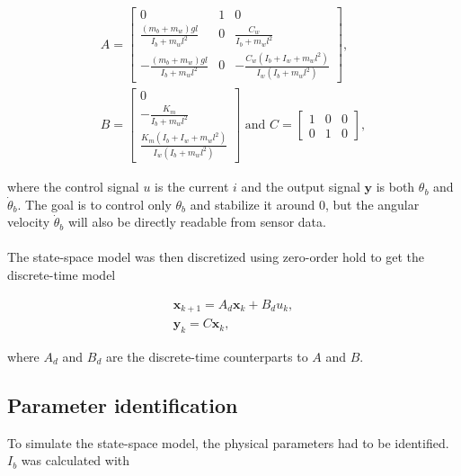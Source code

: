 \begin{equation}\label{eq:ss-matrices}
    \begin{gathered}
        A =
        \begin{bmatrix}
            0 & 1 & 0 \\
            \frac{(m_b+m_w)gl}{I_b+m_wl^2} & 0 & \frac{C_w}{I_b+m_wl^2} \\
            -\frac{(m_b+m_w)gl}{I_b+m_wl^2} & 0 & -\frac{C_w(I_b+I_w+m_wl^2)}{I_w(I_b+m_wl^2)}
        \end{bmatrix}
        , \\
        B =
        \begin{bmatrix}
            0 \\
            -\frac{K_m}{I_b + m_wl^2} \\
            \frac{K_m(I_b+I_w+m_wl^2)}{I_w(I_b+m_wl^2)}
        \end{bmatrix}
        \text{ and } C =
        \begin{bmatrix}
            1 & 0 & 0 \\
            0 & 1 & 0 
        \end{bmatrix},
    \end{gathered}
\end{equation}

\noindent
where the control signal $u$ is the current $i$ and the output signal $\mathbf{y}$ is both $\theta_b$ and $\dot\theta_b$. The goal is to control only $\theta_b$ and stabilize it around 0, but the angular velocity $\dot\theta_b$ will also be directly readable from sensor data.
\\\\
The state-space model was then discretized using zero-order hold to get the discrete-time model

\begin{equation}\label{eq:ss-disc}
    \begin{gathered}
        \mathbf{x}_{k+1} = A_d\mathbf{x}_k + B_du_k,\\
        \mathbf{y}_k = C\mathbf{x}_k,
    \end{gathered}
\end{equation}

\noindent
where $A_d$ and $B_d$ are the discrete-time counterparts to $A$ and $B$.

\subsection{Parameter identification}
To simulate the state-space model, the physical parameters had to be identified. $I_b$ was calculated with

